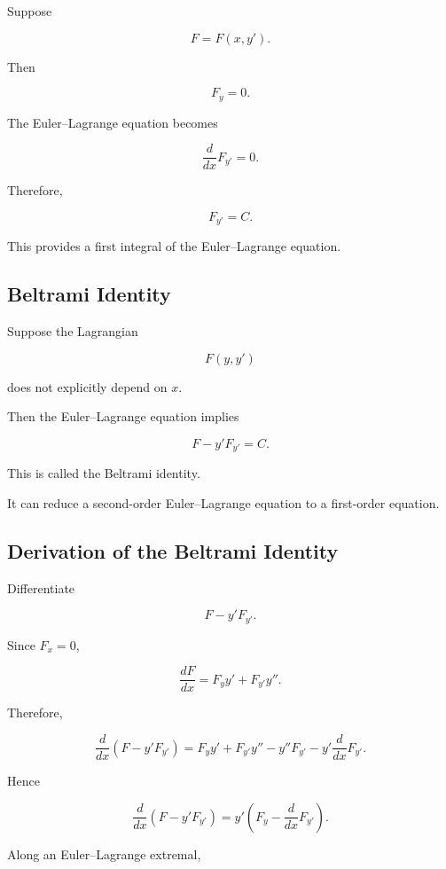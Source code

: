 Suppose

\[
F=F(x,y').
\]

Then

\[
F_y=0.
\]

The Euler--Lagrange equation becomes

\[
\frac{d}{dx}
F_{y'}
=
0.
\]

Therefore,

\[
\boxed{
F_{y'}=C.
}
\]

This provides a first integral of the Euler--Lagrange equation.

\subsection{Beltrami Identity}
\label{subsec:beltrami-identity}

Suppose the Lagrangian

\[
F(y,y')
\]

does not explicitly depend on \(x\).

Then the Euler--Lagrange equation implies

\[
\boxed{
F-y'F_{y'}
=
C.
}
\]

This is called the Beltrami identity.

It can reduce a second-order Euler--Lagrange equation to a first-order
equation.

\subsection{Derivation of the Beltrami Identity}
\label{subsec:beltrami-derivation}

Differentiate

\[
F-y'F_{y'}.
\]

Since \(F_x=0\),

\[
\frac{dF}{dx}
=
F_yy'
+
F_{y'}y''.
\]

Therefore,

\[
\frac{d}{dx}
\left(
F-y'F_{y'}
\right)
=
F_yy'
+
F_{y'}y''
-
y''F_{y'}
-
y'
\frac{d}{dx}F_{y'}.
\]

Hence

\[
\frac{d}{dx}
\left(
F-y'F_{y'}
\right)
=
y'
\left(
F_y
-
\frac{d}{dx}F_{y'}
\right).
\]

Along an Euler--Lagrange extremal,

